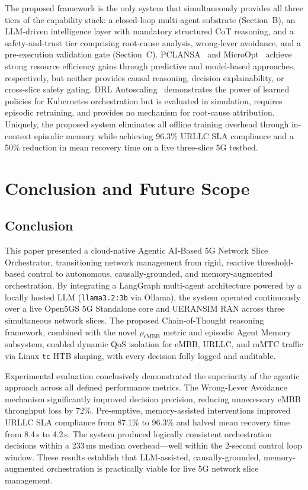 \documentclass[12pt]{article}
\begin{document}
The proposed framework is the only system that simultaneously provides all three
tiers of the capability stack: a closed-loop multi-agent substrate (Section~B),
an LLM-driven intelligence layer with mandatory structured CoT reasoning, and a
safety-and-trust tier comprising root-cause analysis, wrong-lever avoidance, and
a pre-execution validation gate (Section~C). PCLANSA~\cite{tran2025closed} and
MicroOpt~\cite{sulaiman2024microopt} achieve strong resource efficiency gains
through predictive and model-based approaches, respectively, but neither provides
causal reasoning, decision explainability, or cross-slice safety gating. DRL
Autoscaling~\cite{reddy2025drl} demonstrates the power of learned policies for
Kubernetes orchestration but is evaluated in simulation, requires episodic
retraining, and provides no mechanism for root-cause attribution. Uniquely, the
proposed system eliminates all offline training overhead through in-context episodic
memory while achieving 96.3\% URLLC SLA compliance and a 50\% reduction in mean
recovery time on a live three-slice 5G testbed.


\section{Conclusion and Future Scope}
\label{sec:conclusion}

\subsection{Conclusion}

This paper presented a cloud-native Agentic AI-Based 5G Network Slice
Orchestrator, transitioning network management from rigid, reactive
threshold-based control to autonomous, causally-grounded, and
memory-augmented orchestration. By integrating a LangGraph multi-agent
architecture powered by a locally hosted LLM (\texttt{llama3.2:3b} via
Ollama), the system operated continuously over a live Open5GS 5G
Standalone core and UERANSIM RAN across three simultaneous network
slices. The proposed Chain-of-Thought reasoning framework, combined with
the novel $\rho_\text{eMBB}$ metric and episodic Agent Memory subsystem,
enabled dynamic QoS isolation for eMBB, URLLC, and mMTC traffic via
Linux \texttt{tc} HTB shaping, with every decision fully logged and
auditable.

Experimental evaluation conclusively demonstrated the superiority of the
agentic approach across all defined performance metrics. The Wrong-Lever
Avoidance mechanism significantly improved decision precision, reducing
unnecessary eMBB throughput loss by 72\%. Pre-emptive, memory-assisted
interventions improved URLLC SLA compliance from 87.1\% to 96.3\% and
halved mean recovery time from 8.4\,s to 4.2\,s. The system produced
logically consistent orchestration decisions within a 233\,ms median
overhead---well within the 2-second control loop window. These results
establish that LLM-assisted, causally-grounded, memory-augmented
orchestration is practically viable for live 5G network slice management.
\end{document}
